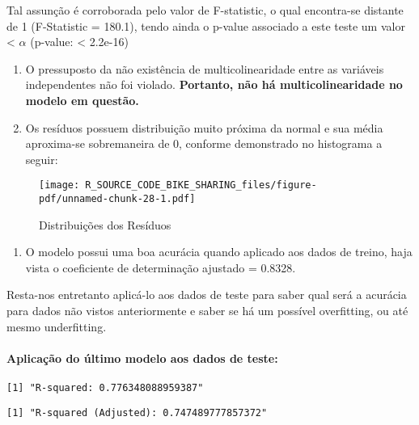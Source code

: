 \documentclass[
  letterpaper,
  DIV=11,
  numbers=noendperiod]{scrartcl}
\let\oldparagraph\paragraph
\renewcommand{\paragraph}[1]{\oldparagraph{#1}\mbox{}}
\providecommand{\tightlist}{%
  \setlength{\itemsep}{0pt}\setlength{\parskip}{0pt}}\usepackage{longtable,booktabs,array}
\begin{document}
Tal assunção é corroborada pelo valor de F-statistic, o qual encontra-se
distante de 1 (F-Statistic = 180.1), tendo ainda o p-value associado a
este teste um valor \textless{} \(\alpha\) (p-value: \textless{}
2.2e-16)

\begin{enumerate}
\def\labelenumi{\arabic{enumi})}
\setcounter{enumi}{1}
\item
  O pressuposto da não existência de multicolinearidade entre as
  variáveis independentes não foi violado. \textbf{Portanto, não há
  multicolinearidade no modelo em questão.}
\item
  Os resíduos possuem distribuição muito próxima da normal e sua média
  aproxima-se sobremaneira de 0, conforme demonstrado no histograma a
  seguir:
\end{enumerate}

\begin{figure}[H]

{\centering \texttt{[image: R\_SOURCE\_CODE\_BIKE\_SHARING\_files/figure-pdf/unnamed-chunk-28-1.pdf]}

}

\caption{Distribuições dos Resíduos}

\end{figure}%

\begin{enumerate}
\def\labelenumi{\arabic{enumi})}
\setcounter{enumi}{3}
\tightlist
\item
  O modelo possui uma boa acurácia quando aplicado aos dados de treino,
  haja vista o coeficiente de determinação ajustado = 0.8328.
\end{enumerate}

Resta-nos entretanto aplicá-lo aos dados de teste para saber qual será a
acurácia para dados não vistos anteriormente e saber se há um possível
overfitting, ou até mesmo underfitting.

\paragraph{Aplicação do último modelo aos dados de
teste:}\label{aplicauxe7uxe3o-do-uxfaltimo-modelo-aos-dados-de-teste}

\begin{verbatim}
[1] "R-squared: 0.776348088959387"
\end{verbatim}

\begin{verbatim}
[1] "R-squared (Adjusted): 0.747489777857372"
\end{verbatim}
\end{document}
